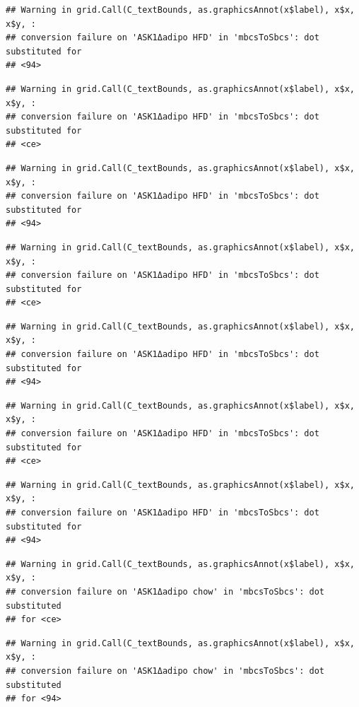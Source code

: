 \documentclass[]{book}
\begin{document}
\begin{verbatim}
## Warning in grid.Call(C_textBounds, as.graphicsAnnot(x$label), x$x, x$y, :
## conversion failure on 'ASK1Δadipo HFD' in 'mbcsToSbcs': dot substituted for
## <94>
\end{verbatim}

\begin{verbatim}
## Warning in grid.Call(C_textBounds, as.graphicsAnnot(x$label), x$x, x$y, :
## conversion failure on 'ASK1Δadipo HFD' in 'mbcsToSbcs': dot substituted for
## <ce>
\end{verbatim}

\begin{verbatim}
## Warning in grid.Call(C_textBounds, as.graphicsAnnot(x$label), x$x, x$y, :
## conversion failure on 'ASK1Δadipo HFD' in 'mbcsToSbcs': dot substituted for
## <94>
\end{verbatim}

\begin{verbatim}
## Warning in grid.Call(C_textBounds, as.graphicsAnnot(x$label), x$x, x$y, :
## conversion failure on 'ASK1Δadipo HFD' in 'mbcsToSbcs': dot substituted for
## <ce>
\end{verbatim}

\begin{verbatim}
## Warning in grid.Call(C_textBounds, as.graphicsAnnot(x$label), x$x, x$y, :
## conversion failure on 'ASK1Δadipo HFD' in 'mbcsToSbcs': dot substituted for
## <94>
\end{verbatim}

\begin{verbatim}
## Warning in grid.Call(C_textBounds, as.graphicsAnnot(x$label), x$x, x$y, :
## conversion failure on 'ASK1Δadipo HFD' in 'mbcsToSbcs': dot substituted for
## <ce>
\end{verbatim}

\begin{verbatim}
## Warning in grid.Call(C_textBounds, as.graphicsAnnot(x$label), x$x, x$y, :
## conversion failure on 'ASK1Δadipo HFD' in 'mbcsToSbcs': dot substituted for
## <94>
\end{verbatim}

\begin{verbatim}
## Warning in grid.Call(C_textBounds, as.graphicsAnnot(x$label), x$x, x$y, :
## conversion failure on 'ASK1Δadipo chow' in 'mbcsToSbcs': dot substituted
## for <ce>
\end{verbatim}

\begin{verbatim}
## Warning in grid.Call(C_textBounds, as.graphicsAnnot(x$label), x$x, x$y, :
## conversion failure on 'ASK1Δadipo chow' in 'mbcsToSbcs': dot substituted
## for <94>
\end{verbatim}
\end{document}
